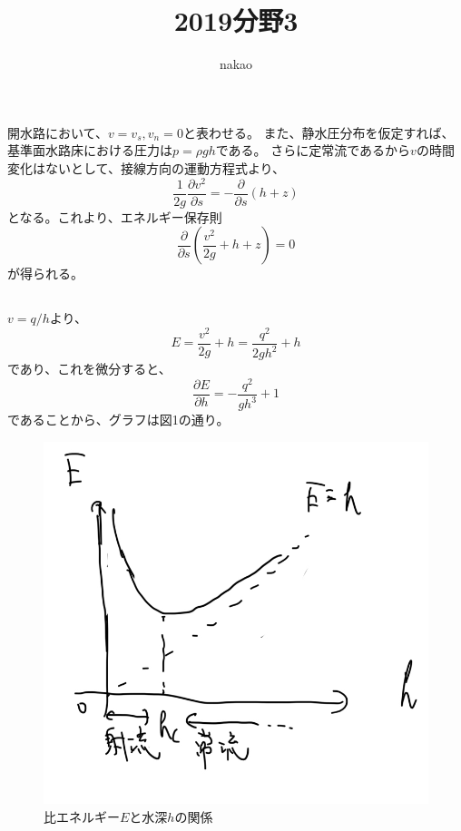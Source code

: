 \documentclass[a4paper]{jsarticle}
\begin{document}
\title{2019分野3}
\author{nakao}
\maketitle

\section{}
\subsection{}
開水路において、$v = v_s, v_n = 0$と表わせる。
また、静水圧分布を仮定すれば、基準面水路床における圧力は$p = \rho g h$である。
さらに定常流であるから$v$の時間変化はないとして、接線方向の運動方程式より、
\begin{equation}
  \frac{1}{2g} \frac{\partial v^2}{\partial s} 
  = -\frac{\partial}{\partial s}(h + z)
\end{equation}
となる。これより、エネルギー保存則
\begin{equation}
  \frac{\partial}{\partial s} \left(\frac{v^2}{2g} + h + z\right) = 0
\end{equation}
が得られる。

\subsection{}
$v = q / h$より、
\begin{equation}
  E = \frac{v^2}{2g} + h
  = \frac{q^2}{2g h^2} + h
\end{equation}
であり、これを微分すると、
\begin{equation}
  \frac{\partial E}{\partial h} = -\frac{q^2}{g h^3} + 1
\end{equation}
であることから、グラフは図1の通り。
\begin{figure}[htb]
  \centering
  \includegraphics[width=0.3\hsize]{fig1.png}
  \caption{比エネルギー$E$と水深$h$の関係}
\end{figure}
\end{document}
